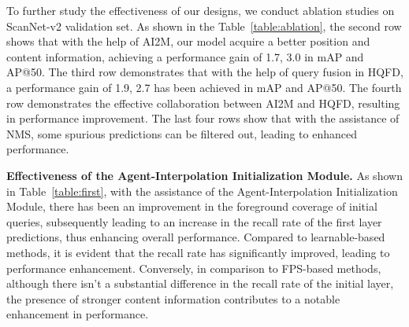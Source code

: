 To further study the effectiveness of our designs, we conduct ablation studies on ScanNet-v2 validation set. 
As shown in the Table~\ref{table:ablation}, the second row shows that with the help of AI2M, our model acquire a better position and content information, achieving a performance gain of 1.7, 3.0 in mAP and AP@50.
The third row demonstrates that with the help of query fusion in HQFD, a performance gain of 1.9, 2.7 has been achieved in mAP and AP@50. The fourth row demonstrates the effective collaboration between AI2M and HQFD, resulting in performance improvement. The last four rows show that with the assistance of NMS, some spurious predictions can be filtered out, leading to enhanced performance.
%

\textbf{Effectiveness of the Agent-Interpolation Initialization Module.}
As shown in Table~\ref{table:first}, with the assistance of the Agent-Interpolation Initialization Module, there has been an improvement in the foreground coverage of initial queries, subsequently leading to an increase in the recall rate of the first layer predictions, thus enhancing overall performance. Compared to learnable-based methods, it is evident that the recall rate has significantly improved, leading to performance enhancement. Conversely, in comparison to FPS-based methods, although there isn't a substantial difference in the recall rate of the initial layer, the presence of stronger content information contributes to a notable enhancement in performance.

